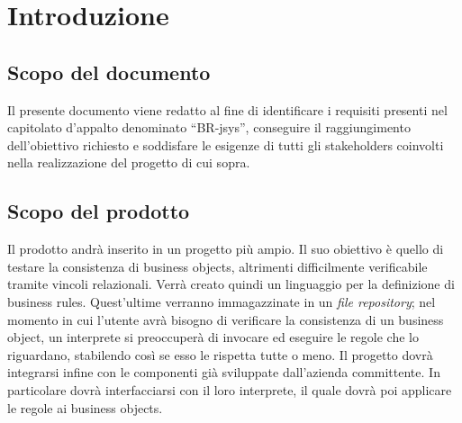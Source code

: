 \documentclass[11pt,titlepage,a4paper]{report}
\begin{document}
\tableofcontents

\chapter{Introduzione}
\section{Scopo del documento}
Il presente documento viene redatto al fine di identificare i requisiti presenti nel capitolato d'appalto denominato ``BR-jsys'', conseguire il raggiungimento dell'obiettivo richiesto e soddisfare le esigenze di tutti gli stakeholders coinvolti nella realizzazione del progetto di cui sopra.
\section{Scopo del prodotto}
Il prodotto andr\`a inserito in un progetto pi\`u ampio. Il suo obiettivo \`e quello di testare la consistenza di business objects, altrimenti difficilmente verificabile tramite vincoli relazionali.
Verr\`a creato quindi un linguaggio per la definizione di business rules. Quest'ultime verranno immagazzinate in un \textit{file repository}; nel momento in cui l'utente avr\`a bisogno di verificare la consistenza di un business object, un interprete si preoccuper\`a di invocare ed eseguire le regole che lo riguardano, stabilendo cos\`i se esso le rispetta tutte o meno.
Il progetto dovr\`a integrarsi infine con le componenti gi\`a sviluppate dall'azienda committente. In particolare dovr\`a interfacciarsi con il loro interprete, il quale dovr\`a poi applicare le regole ai business objects.
\end{document}
